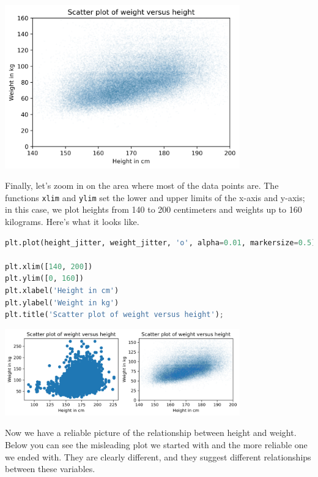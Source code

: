 \begin{center}
\includegraphics[width=4in]{chapters/09_relationships_files/09_relationships_26_0.png}
\end{center}

Finally, let's zoom in on the area where most of the data points are.
The functions \passthrough{\lstinline!xlim!} and
\passthrough{\lstinline!ylim!} set the lower and upper limits of the
x-axis and y-axis; in this case, we plot heights from 140 to 200
centimeters and weights up to 160 kilograms. Here's what it looks like.

\begin{lstlisting}[language=Python,style=source]
plt.plot(height_jitter, weight_jitter, 'o', alpha=0.01, markersize=0.5)

plt.xlim([140, 200])
plt.ylim([0, 160])
plt.xlabel('Height in cm')
plt.ylabel('Weight in kg')
plt.title('Scatter plot of weight versus height');
\end{lstlisting}

\begin{center}
\includegraphics[width=4in]{chapters/09_relationships_files/09_relationships_28_0.png}
\end{center}

Now we have a reliable picture of the relationship between height and
weight. Below you can see the misleading plot we started with and the
more reliable one we ended with. They are clearly different, and they
suggest different relationships between these variables.

